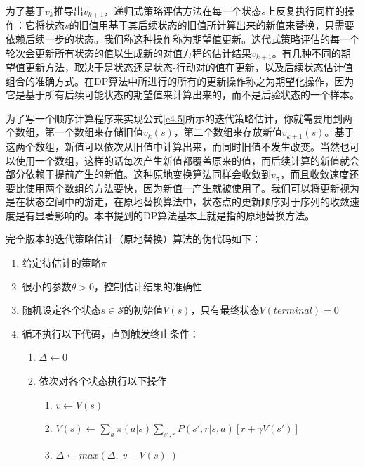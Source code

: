 \documentclass{ctexart}
\begin{document}
            为了基于$v_k$推导出$v_{k+1}$，递归式策略评估方法在每一个状态$s$上反复执行同样的操作：它将状态$s$的旧值用基于其后续状态的旧值所计算出来的新值来替换，只需要依赖后续一步的状态。我们称这种操作称为期望值更新。迭代式策略评估的每一个轮次会更新所有状态的值以生成新的对值方程的估计结果$v_{k+1}$。有几种不同的期望值更新方法，取决于是状态还是状态-行动对的值在更新，以及后续状态估计值组合的准确方式。在DP算法中所进行的所有的更新操作称之为期望化操作，因为它是基于所有后续可能状态的期望值来计算出来的，而不是后验状态的一个样本。

            为了写一个顺序计算程序来实现公式\ref{e4.5}所示的迭代策略估计，你就需要用到两个数组，第一个数组来存储旧值$v_k(s)$，第二个数组来存放新值$v_{k+1}(s)$。基于这两个数组，新值可以依次从旧值中计算出来，而同时旧值不发生改变。当然也可以使用一个数组，这样的话每次产生新值都覆盖原来的值，而后续计算的新值就会部分依赖于提前产生的新值。这种原地变换算法同样会收敛到$v_{\pi}$，而且收敛速度还要比使用两个数组的方法要快，因为新值一产生就被使用了。我们可以将更新视为是在状态空间中的游走，在原地替换算法中，状态点的更新顺序对于序列的收敛速度是有显著影响的。本书提到的DP算法基本上就是指的原地替换方法。

            完全版本的迭代策略估计（原地替换）算法的伪代码如下：
            \begin{enumerate}
                \item 给定待估计的策略$\pi$
                \item 很小的参数$\theta > 0$，控制估计结果的准确性
                \item 随机设定各个状态$s\in \mathcal{S}$的初始值$V(s)$，只有最终状态$V(terminal)=0$
                \item 循环执行以下代码，直到触发终止条件：
                \begin{enumerate}
                    \item $\Delta \leftarrow 0$
                    \item 依次对各个状态执行以下操作
                    \begin{enumerate}
                        \item $v \leftarrow V(s)$
                        \item $V(s)\leftarrow \sum_a \pi(a|s) \sum_{s',r} P(s',r|s,a)[r + \gamma V(s')]$
                        \item $\Delta \leftarrow max(\Delta,|v-V(s)|)$
                    \end{enumerate}
                \end{enumerate}
            \end{enumerate}
\end{document}
